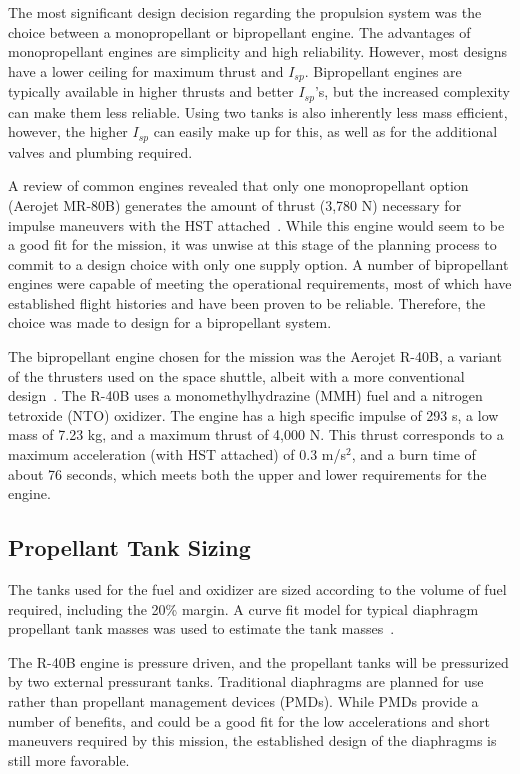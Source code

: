 \documentclass[paper=letter, fontsize=11pt]{scrartcl} %
\numberwithin{equation}{section} %
\numberwithin{figure}{section} %
\numberwithin{table}{section} %
\begin{document}
The most significant design decision regarding the propulsion system was the choice between a monopropellant or bipropellant engine. The advantages of monopropellant engines are simplicity and high reliability. However, most designs have a lower ceiling for maximum thrust and $I_{sp}$. Bipropellant engines are typically available in higher thrusts and better $I_{sp}$'s, but the increased complexity can make them less reliable. Using two tanks is also inherently less mass efficient, however, the higher $I_{sp}$ can easily make up for this, as well as for the additional valves and plumbing required.

A review of common engines revealed that only one monopropellant option (Aerojet MR-80B) generates the amount of thrust (3,780 N) necessary for impulse maneuvers with the HST attached~\cite{monoprop}. While this engine would seem to be a good fit for the mission, it was unwise at this stage of the planning process to commit to a design choice with only one supply option. A number of bipropellant engines were capable of meeting the operational requirements, most of which have established flight histories and have been proven to be reliable. Therefore, the choice was made to design for a bipropellant system.

The bipropellant engine chosen for the mission was the Aerojet R-40B, a variant of the thrusters used on the space shuttle, albeit with a more conventional design~\cite{biprop}. The R-40B uses a monomethylhydrazine (MMH) fuel and a nitrogen tetroxide (NTO) oxidizer. The engine has a high specific impulse of 293 s, a low mass of 7.23 kg, and a maximum thrust of 4,000 N. This thrust corresponds to a maximum acceleration (with HST attached) of 0.3 m/s$^2$, and a burn time of about 76 seconds, which meets both the upper and lower requirements for the engine.

\subsection{Propellant Tank Sizing}

The tanks used for the fuel and oxidizer are sized according to the volume of fuel required, including the 20\% margin. A curve fit model for typical diaphragm propellant tank masses was used to estimate the tank masses~\cite{ref12_8}.

The R-40B engine is pressure driven, and the propellant tanks will be pressurized by two external pressurant tanks. Traditional diaphragms are planned for use rather than propellant management devices (PMDs). While PMDs provide a number of benefits, and could be a good fit for the low accelerations and short maneuvers required by this mission, the established design of the diaphragms is still more favorable.
\end{document}

